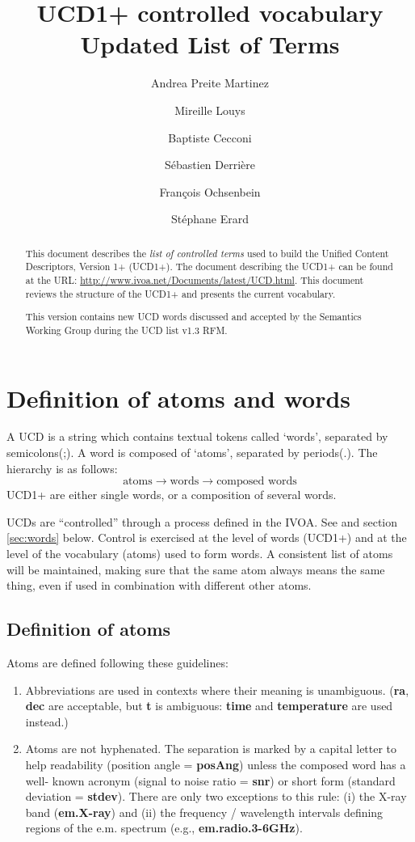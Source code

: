 \documentclass[11pt,a4paper]{ivoa}
\title{UCD1+ controlled vocabulary\\Updated List of Terms}
\author{Andrea Preite Martinez}
\author{Mireille Louys}
\author{Baptiste Cecconi}
\author{S\'ebastien Derri\`ere}
\author{Fran\c cois Ochsenbein}
\author{St\'ephane Erard}
\begin{document}
\begin{abstract}
This document describes the \emph{list of controlled terms} used to build the Unified Content Descriptors, Version 1+ (UCD1+). 
The document describing the UCD1+ can be found at the URL: \url{http://www.ivoa.net/Documents/latest/UCD.html}. This 
document reviews the structure of the UCD1+ and presents the current vocabulary.  

This version contains new UCD words discussed and accepted by the Semantics Working Group during the UCD list v1.3 RFM.

\end{abstract} 

\section{Definition of atoms and words}
A UCD is a string which contains textual tokens called `words', separated by semicolons(;). A word is composed of 
`atoms', separated by periods(.). The hierarchy is as follows: 
$$
\textrm{atoms} \rightarrow \textrm{words} \rightarrow \textrm{composed words}
$$
UCD1+ are either single words, or a composition of several words.

UCDs are ``controlled'' through a process defined in the IVOA. See \citet{std:UCD} and section \ref{sec:words} below. 
Control is exercised at the level of words (UCD1+) and at the level of the vocabulary (atoms) used to form words. A 
consistent list of atoms will be maintained, making sure that the same atom always means the same thing, even if used 
in combination with different other atoms. 

\subsection{Definition of atoms}
Atoms are defined following these guidelines:
\begin{enumerate}
\item Abbreviations are used in contexts where their meaning is unambiguous. ({\bf ra}, {\bf dec} are 
acceptable, but {\bf t} is ambiguous: {\bf time} and {\bf temperature} are used instead.)
\item Atoms are not hyphenated. The separation is marked by a capital letter to help readability 
(position angle = {\bf posAng}) unless the composed word has a well- known acronym (signal to noise ratio = 
{\bf snr}) or short form (standard deviation = {\bf stdev}). There are only two exceptions to this rule: 
(i) the X-ray band ({\bf em.X-ray}) and (ii) the frequency / wavelength intervals defining regions of the 
e.m. spectrum (e.g., {\bf em.radio.3-6GHz}).
\end{enumerate}
\end{document}
